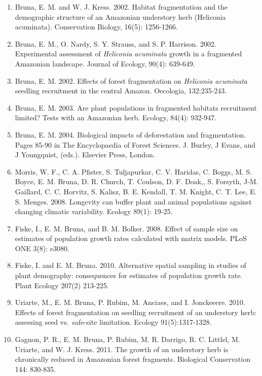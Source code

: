 \documentclass[
  english,
  man]{apa6}
\begin{document}
\begin{enumerate}
\def\labelenumi{\arabic{enumi}.}
\item
  Bruna, E. M. and W. J. Kress. 2002. Habitat fragmentation and the
  demographic structure of an Amazonian understory herb (Heliconia
  acuminata). Conservation Biology, 16(5): 1256-1266.
\item
  Bruna, E. M., O. Nardy, S. Y. Strauss, and S. P. Harrison. 2002.
  Experimental assessment of \emph{Heliconia acuminata} growth in a
  fragmented Amazonian landscape. Journal of Ecology, 90(4): 639-649.
\item
  Bruna, E. M. 2002. Effects of forest fragmentation on \emph{Heliconia
  acuminata} seedling recruitment in the central Amazon. Oecologia,
  132:235-243.
\item
  Bruna, E. M. 2003. Are plant populations in fragmented habitats
  recruitment limited? Tests with an Amazonian herb. Ecology, 84(4):
  932-947.
\item
  Bruna, E. M. 2004. Biological impacts of deforestation and
  fragmentation. Pages 85-90 in The Encyclopaedia of Forest
  Sciences. J. Burley, J Evans, and J Youngquist, (eds.). Elsevier
  Press, London.
\item
  Morris, W. F., C. A. Pfister, S. Tuljapurkar, C. V. Haridas, C.
  Boggs, M. S. Boyce, E. M. Bruna, D. R. Church, T. Coulson, D. F.
  Doak,, S. Forsyth, J-M. Gaillard, C. C. Horvitz, S. Kalisz, B. E.
  Kendall, T. M. Knight, C. T. Lee, E. S. Menges. 2008. Longevity can
  buffer plant and animal populations against changing climatic
  variability. Ecology 89(1): 19-25.
\item
  Fiske, I., E. M. Bruna, and B. M. Bolker. 2008. Effect of sample
  size on estimates of population growth rates calculated with matrix
  models. PLoS ONE 3(8): e3080.
\item
  Fiske, I. and E. M. Bruna. 2010. Alternative spatial sampling in
  studies of plant demography: consequences for estimates of
  population growth rate. Plant Ecology 207(2) 213-225.
\item
  Uriarte, M., E. M. Bruna, P. Rubim, M. Anciaes, and I.
  Jonckeeere. 2010. Effects of forest fragmentation on seedling
  recruitment of an understory herb: assessing seed vs.~safe-site
  limitation. Ecology 91(5):1317-1328.
\item
  Gagnon, P. R., E. M. Bruna, P. Rubim, M. R. Darrigo, R. C.
  Littlel, M. Uriarte, and W. J. Kress. 2011. The growth of an
  understory herb is chronically reduced in Amazonian forest
  fragments. Biological Conservation 144: 830-835.

\end{enumerate}
\end{document}
